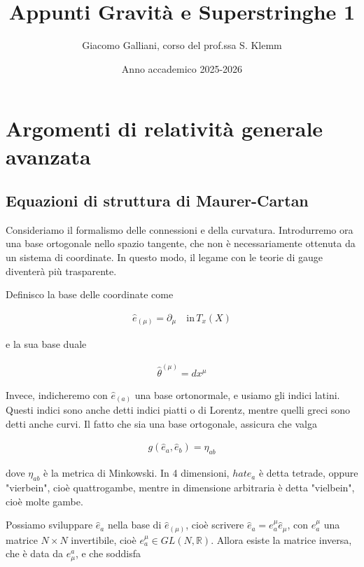 \documentclass{report}
\title{\Huge{\textbf{Appunti Gravità e Superstringhe 1}}}
\author{Giacomo Galliani, corso del prof.ssa S. Klemm}
\date{Anno accademico 2025-2026}
\renewcommand{\contentsname}{Indice}
\begin{document}
\maketitle
\newpage%
\pdfbookmark[section]{\contentsname}{toc}
\tableofcontents
\pagebreak

\chapter{Argomenti di relatività generale avanzata}


\section{Equazioni di struttura di Maurer-Cartan}

Consideriamo il formalismo delle connessioni e della curvatura. Introdurremo ora una base ortogonale nello spazio tangente, che non è necessariamente ottenuta da un sistema di coordinate. In questo modo, il legame con le teorie di gauge diventerà più trasparente. 


Definisco la base delle coordinate come 

\begin{align}
    \hat{e}_{(\mu)} = \partial_\mu \quad \text{in} \, T_x(X)
\end{align}

e la sua base duale 

\begin{align}
    \hat{\theta}^{(\mu)} = dx^\mu
\end{align}

Invece, indicheremo con \(\hat{e}_{(a)}\) una base ortonormale, e usiamo gli indici latini. Questi indici sono anche detti indici piatti o di Lorentz, mentre quelli greci sono detti anche curvi. Il fatto che sia una base ortogonale, assicura che valga 

\begin{align}
    g(\hat{e}_a, \hat{e}_b) = \eta_{ab}
\end{align}

dove \(\eta_{ab}\) è la metrica di Minkowski. In 4 dimensioni, \(hat{e}_a\) è detta tetrade, oppure "vierbein", cioè quattrogambe, mentre in dimensione arbitraria è detta "vielbein", cioè molte gambe. 


Possiamo sviluppare \(\hat{e}_a\) nella base di \(\hat{e}_{(\mu)}\), cioè scrivere \(\hat{e}_a = e^\mu_a \hat{e}_\mu\), con \(e^\mu_a\) una matrice \(N \times N\) invertibile, cioè \(e^\mu_a \in GL(N, \mathbb{R})\). Allora esiste la matrice inversa, che è data da \(e^a_\mu\), e che soddisfa 
\end{document}
